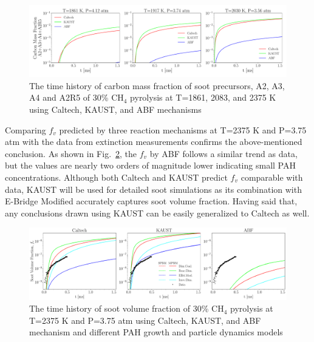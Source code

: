 \begin{figure}[H]
	\centering
	\includegraphics[width=1\textwidth]{Figures/Results/Shocktube/Stanford/june/30CH4_SPC_mechs_nosoot_subset.pdf}
	\caption{The time history of carbon mass fraction of soot precursors, A2, A3, A4 and A2R5 of 30\% $\mathrm{CH_4}$ pyrolysis at T=1861, 2083, and 2375 K using Caltech, KAUST, and ABF mechanisms}
	\label{fig:shocktubest_30ch4_spc_nosoot_subset} 
\end{figure}

Comparing $f_v$ predicted by three reaction mechanisms at T=2375 K and P=3.75 atm with the data from extinction measurements confirms the above-mentioned conclusion. As shown in Fig.~\ref{fig:shocktubest_30ch4_sootvf_single}, the $f_v$ by ABF follows a similar trend as data, but the values are nearly two orders of magnitude lower indicating small PAH concentrations. Although both Caltech and KAUST predict $f_v$ comparable with data, KAUST will be used for detailed soot simulations as its combination with E-Bridge Modified accurately captures soot volume fraction. Having said that, any conclusions drawn using KAUST can be easily generalized to Caltech as well.


\begin{figure}[H]
	\centering
	\includegraphics[width=1\textwidth]{Figures/Results/Shocktube/Stanford/june/30CH4_sootvf_mechs_single.pdf}
	\caption{The time history of soot volume fraction of 30\% $\mathrm{CH_4}$ pyrolysis at T=2375 K and P=3.75 atm using Caltech, KAUST, and ABF mechanism and different PAH growth and particle dynamics models}
	\label{fig:shocktubest_30ch4_sootvf_single} 
\end{figure}

